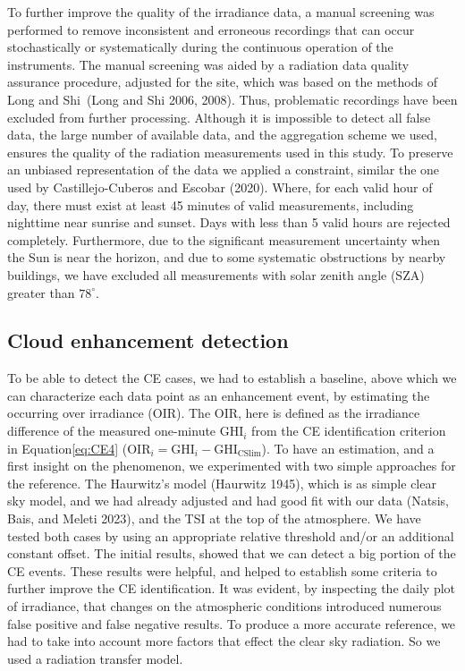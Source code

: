 \documentclass[
]{article}
\begin{document}
To further improve the quality of the irradiance data, a manual screening was
performed to remove inconsistent and erroneous recordings that can occur
stochastically or systematically during the continuous operation of the instruments.
The manual screening was aided by a radiation data quality assurance procedure,
adjusted for the site, which was based on the methods of Long and Shi~(Long and Shi 2006, 2008). Thus, problematic recordings have been excluded from further
processing. Although it is impossible to detect all false data, the large number of
available data, and the aggregation scheme we used, ensures the quality of the
radiation measurements used in this study.
To preserve an unbiased representation of the data we applied a constraint, similar
the one used by Castillejo-Cuberos and Escobar (2020). Where, for each valid hour of day, there must
exist at least 45 minutes of valid measurements, including nighttime near sunrise and
sunset. Days with less than 5 valid hours are rejected completely.
Furthermore, due to the significant measurement uncertainty when the Sun is near the
horizon, and due to some systematic obstructions by nearby buildings, we have
excluded all measurements with solar zenith angle (SZA) greater than
\(78^\circ\).

\hypertarget{cloud-enhancement-detection}{%
\subsection{Cloud enhancement detection}\label{cloud-enhancement-detection}}

To be able to detect the CE cases, we had to establish a baseline, above which we can
characterize each data point as an enhancement event, by estimating the occurring
over irradiance (OIR). The OIR, here is defined as the irradiance difference of the
measured one-minute \(\text{GHI}_i\) from the CE identification criterion in
Equation\nobreakspace\ref{eq:CE4}
(\(\text{OIR}_i = \text{GHI}_i - \text{GHI}_\text{CSlim}\)).
To have an estimation, and a first insight on the phenomenon, we experimented with two
simple approaches for the reference. The Haurwitz's model (Haurwitz 1945), which is
as simple clear sky model, and we had already adjusted and had good fit with our data
(Natsis, Bais, and Meleti 2023), and the TSI at the top of the atmosphere. We have tested both cases
by using an appropriate relative threshold and/or an additional constant offset. The
initial results, showed that we can detect a big portion of the CE events. These
results were helpful, and helped to establish some criteria to further improve the CE
identification. It was evident, by inspecting the daily plot of irradiance, that
changes on the atmospheric conditions introduced numerous false positive and false
negative results. To produce a more accurate reference, we had to take into account
more factors that effect the clear sky radiation. So we used a radiation transfer
model.
\end{document}
